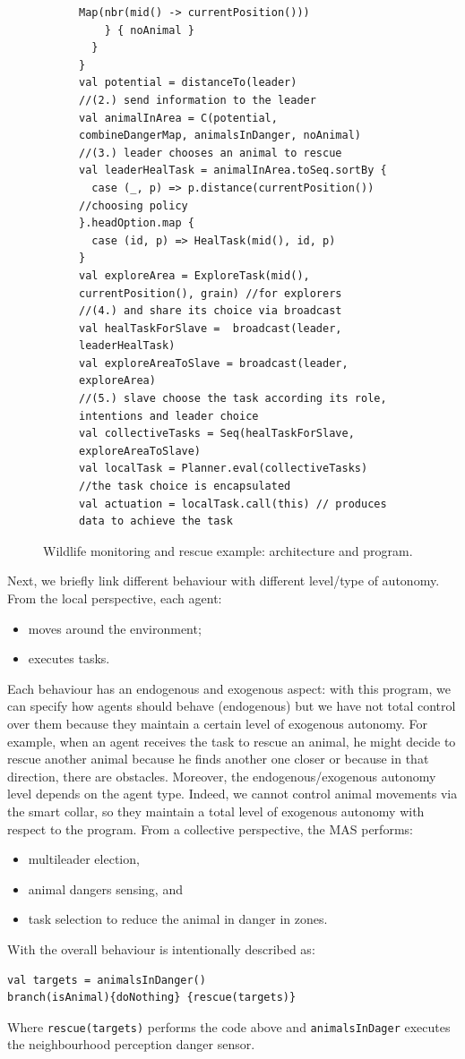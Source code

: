 \begin{figure}
\begin{subfigure}[b]{\textwidth}
\begin{lstlisting}[basicstyle=\lst@ifdisplaystyle\footnotesize\fi\ttfamily]
      Map(nbr(mid() -> currentPosition()))
    } { noAnimal }
  }
}
val potential = distanceTo(leader)
//(2.) send information to the leader
val animalInArea = C(potential, combineDangerMap, animalsInDanger, noAnimal)
//(3.) leader chooses an animal to rescue
val leaderHealTask = animalInArea.toSeq.sortBy {
  case (_, p) => p.distance(currentPosition()) //choosing policy
}.headOption.map {
  case (id, p) => HealTask(mid(), id, p)
}
val exploreArea = ExploreTask(mid(), currentPosition(), grain) //for explorers
//(4.) and share its choice via broadcast
val healTaskForSlave =  broadcast(leader, leaderHealTask)
val exploreAreaToSlave = broadcast(leader, exploreArea)
//(5.) slave choose the task according its role, intentions and leader choice
val collectiveTasks = Seq(healTaskForSlave, exploreAreaToSlave)
val localTask = Planner.eval(collectiveTasks) //the task choice is encapsulated
val actuation = localTask.call(this) // produces data to achieve the task 
\end{lstlisting}
\caption{}
\label{mdpi2020:fig:wildlife-code}
\end{subfigure}
%
\caption{Wildlife monitoring and rescue example: architecture and program.}
\label{mdpi2020:fig:wildlife-example}
\end{figure}
%
Next, we briefly link different 
 behaviour with different level/type of autonomy. 
%
From the local perspective, each agent:
\begin{itemize}
\item moves around the environment;
\item executes tasks.
\end{itemize}
%
Each behaviour has an endogenous and exogenous aspect: with this program, 
 we can specify how agents should behave (endogenous) but we have not total 
 control over them because they maintain a certain level of exogenous autonomy. 
%
For example, when an agent receives the task to rescue an animal, 
 he might decide to rescue another animal because he finds another one closer or
 because in that direction, there are obstacles. 
%
Moreover, the endogenous/exogenous autonomy level depends on the agent type. 
 Indeed, we cannot control animal movements via the smart collar, 
 so they maintain a total level of exogenous autonomy with respect to the program.
%
From a collective perspective, the MAS performs: 
\begin{itemize}
\item multileader election,
\item animal dangers sensing, and
\item task selection to reduce the animal in danger in zones.
\end{itemize}
%
With \scafi{} the overall behaviour is intentionally described as:
\begin{lstlisting}
val targets = animalsInDanger()
branch(isAnimal){doNothing} {rescue(targets)}
\end{lstlisting}
Where \lstinline|rescue(targets)| performs the code above and \lstinline|animalsInDager|
  executes the neighbourhood perception danger sensor.

